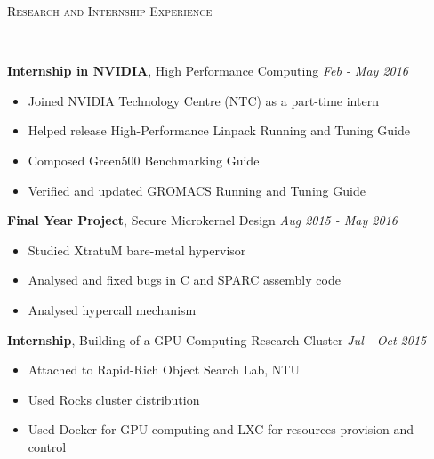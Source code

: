 \documentclass[a4paper, 12pt]{article}
\newenvironment{changemargin}[2]{%
  \begin{list}{}{%
      \setlength{\topsep}{0pt}%
      \setlength{\leftmargin}{#1}%
      \setlength{\rightmargin}{#2}%
      \setlength{\listparindent}{\parindent}%
      \setlength{\itemindent}{\parindent}%
      \setlength{\parsep}{\parskip}%
    }%
  \item[]}{\end{list}
}
\newcommand{\lineover}{
  \begin{changemargin}{-0.05in}{-0.05in}
    \vspace*{-8pt}
    \hrulefill \\
    \vspace*{-2pt}
  \end{changemargin}
}
\newcommand{\header}[1]{
  \begin{changemargin}{-0.6in}{-0.6in}
    \fontsize{15}{15}\scshape{#1}\\
    \lineover
    \vspace*{-4pt}
  \end{changemargin}
}
\newenvironment{body}
{
\vspace*{-16pt}
\begin{changemargin}{-0.25in}{-0.5in}
}
{
\end{changemargin}
}
\begin{document}
\smallskip
\header{Research and Internship Experience}
\begin{body}
  \vspace{14pt}

  \textbf{Internship in NVIDIA}, {High Performance Computing} \hfill \emph{Feb - May 2016}\\
  \vspace*{-6pt}
  \begin{itemize} \itemsep -0pt  \small
  \item Joined NVIDIA Technology Centre (NTC) as a part-time intern
  \item Helped release High-Performance Linpack Running and Tuning Guide
  \item Composed Green500 Benchmarking Guide
  \item Verified and updated GROMACS Running and Tuning Guide
  \end{itemize}

  \textbf{Final Year Project}, {Secure Microkernel Design} \hfill \emph{Aug 2015 - May 2016}\\
  \vspace*{-6pt}
  \begin{itemize} \itemsep -0pt  \small
  \item Studied XtratuM bare-metal hypervisor
  \item Analysed and fixed bugs in C and SPARC assembly code
  \item Analysed hypercall mechanism
  \end{itemize}

  \textbf{Internship}, {Building of a GPU Computing Research Cluster} \hfill \emph{Jul - Oct 2015}\\
  \vspace*{-6pt}
  \begin{itemize} \itemsep -0pt  \small
  \item Attached to Rapid-Rich Object Search Lab, NTU
  \item Used Rocks cluster distribution
  \item Used Docker for GPU computing and LXC for resources provision and control
  \end{itemize}


\end{body}
\end{document}
